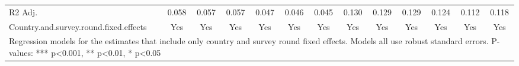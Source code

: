 \begin{table}
\begin{tabular}[t]{lcccccccccccc}
R2 Adj. & \num{0.058} & \num{0.057} & \num{0.057} & \num{0.047} & \num{0.046} & \num{0.045} & \num{0.130} & \num{0.129} & \num{0.129} & \num{0.124} & \num{0.112} & \num{0.118}\\
Country.and.survey.round.fixed.effects & Yes & Yes & Yes & Yes & Yes & Yes & Yes & Yes & Yes & Yes & Yes & Yes\\
\bottomrule
\multicolumn{13}{l}{\rule{0pt}{1em}Regression models for the estimates that include only country and survey round fixed effects. Models all use robust standard errors. P-values: *** p<0.001, ** p<0.01, * p<0.05}\\
\end{tabular}
\end{table}
